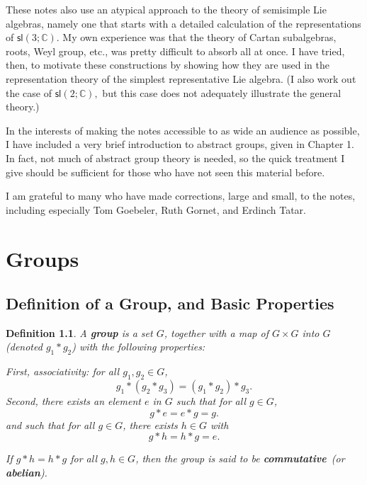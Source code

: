 \documentclass{amsbook}
\theoremstyle{plain}
\newtheorem{definition}[theorem]{Definition}
\numberwithin{equation}{chapter}
\numberwithin{theorem}{chapter}
\begin{document}
These notes also use an atypical approach to the theory of semisimple Lie
algebras, namely one that starts with a detailed calculation of the
representations of $\mathsf{sl}(3;\mathbb{C})$. My own experience was that the
theory of Cartan subalgebras, roots, Weyl group, etc., was pretty difficult to
absorb all at once. I have tried, then, to motivate these constructions by
showing how they are used in the representation theory of the simplest
representative Lie algebra. (I also work out the case of $\mathsf{sl}%
(2;\mathbb{C}),$ but this case does not adequately illustrate the general theory.)

In the interests of making the notes accessible to as wide an audience as
possible, I have included a very brief introduction to abstract groups, given
in Chapter 1. In fact, not much of abstract group theory is needed, so the
quick treatment I give should be sufficient for those who have not seen this
material before.

I am grateful to many who have made corrections, large and small, to the
notes, including especially Tom Goebeler, Ruth Gornet, and Erdinch Tatar.

\mainmatter

\chapter{Groups}

\section{Definition of a Group, and Basic Properties}

\begin{definition}
A \textbf{group} is a set $G$, together with a map of $G\times G$ into $G$
(denoted $g_{1}\ast g_{2}$) with the following properties:

First, associativity: for all $g_{1},g_{2}\in G$,
\begin{equation}
g_{1}\ast(g_{2}\ast g_{3})=(g_{1}\ast g_{2})\ast g_{3}\text{.}%
\label{Associativity}%
\end{equation}
Second, there exists an element $e$ in $G$ such that for all $g\in G$,
\begin{equation}
g\ast e=e\ast g=g\text{.}\label{Identity}%
\end{equation}
and such that for all $g\in G$, there exists $h\in G$ with
\begin{equation}
g\ast h=h\ast g=e\text{.}\label{Inverses}%
\end{equation}

If $g\ast h=h\ast g$ for all $g,h\in G$, then the group is said to be
\textbf{commutative}\emph{\ }(or \textbf{abelian}).
\end{definition}
\end{document}
